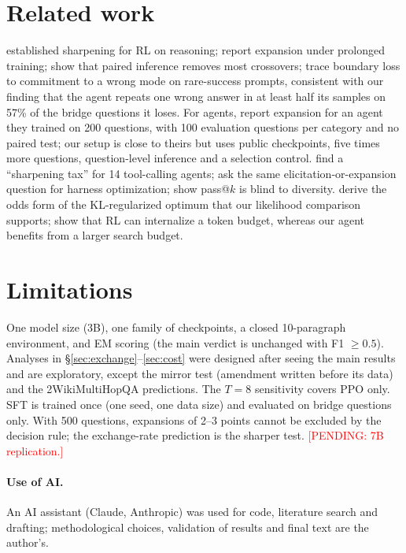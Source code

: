 \documentclass[11pt]{article}
\newcommand{\pending}[1]{\textcolor{red}{[PENDING: #1]}}
\begin{document}
\section{Related work}

\citet{yue2025does} established sharpening for RL on reasoning; \citet{liu2025prorl} report expansion under prolonged training; \citet{yang2026crossovers} show that paired inference removes most crossovers; \citet{zhou2026shrinks} trace boundary loss to commitment to a wrong mode on rare-success prompts, consistent with our finding that the agent repeats one wrong answer in at least half its samples on 57\% of the bridge questions it loses. For agents, \citet{zhai2026does} report expansion for an agent they trained on 200 questions, with 100 evaluation questions per category and no paired test; our setup is close to theirs but uses public checkpoints, five times more questions, question-level inference and a selection control. \citet{oh2026sharpening} find a ``sharpening tax'' for 14 tool-calling agents; \citet{kim2026elicitation} ask the same elicitation-or-expansion question for harness optimization; \citet{rath2026passk} show pass@$k$ is blind to diversity. \citet{matrenok2026controlling} derive the odds form of the KL-regularized optimum that our likelihood comparison supports; \citet{zavidnyi2026budget} show that RL can internalize a token budget, whereas our agent benefits from a larger search budget.

\section{Limitations}

One model size (3B), one family of checkpoints, a closed 10-paragraph environment, and EM scoring (the main verdict is unchanged with F1 $\ge 0.5$). Analyses in \S\ref{sec:exchange}--\ref{sec:cost} were designed after seeing the main results and are exploratory, except the mirror test (amendment written before its data) and the 2WikiMultiHopQA predictions. The $T = 8$ sensitivity covers PPO only. SFT is trained once (one seed, one data size) and evaluated on bridge questions only. With 500 questions, expansions of 2--3 points cannot be excluded by the decision rule; the exchange-rate prediction is the sharper test. \pending{7B replication.}

\paragraph{Use of AI.} An AI assistant (Claude, Anthropic) was used for code, literature search and drafting; methodological choices, validation of results and final text are the author's.



\end{document}
